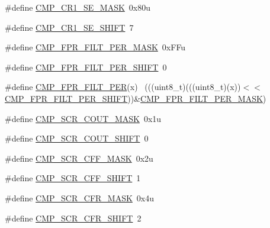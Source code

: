 \begin{DoxyCompactItemize}
\item 
\#define \hyperlink{group___c_m_p___register___masks_ga899d139651dd67746e73452ff19e892b}{C\+M\+P\+\_\+\+C\+R1\+\_\+\+S\+E\+\_\+\+M\+A\+SK}~0x80u
\item 
\#define \hyperlink{group___c_m_p___register___masks_ga57cd3f81d8844d4e0509f342ae5170bb}{C\+M\+P\+\_\+\+C\+R1\+\_\+\+S\+E\+\_\+\+S\+H\+I\+FT}~7
\item 
\#define \hyperlink{group___c_m_p___register___masks_gaf8ca758656c156ecadfbb6f9e57a3eef}{C\+M\+P\+\_\+\+F\+P\+R\+\_\+\+F\+I\+L\+T\+\_\+\+P\+E\+R\+\_\+\+M\+A\+SK}~0x\+F\+Fu
\item 
\#define \hyperlink{group___c_m_p___register___masks_gaa563be7a82c0c1e3802e7ac7c920bf3a}{C\+M\+P\+\_\+\+F\+P\+R\+\_\+\+F\+I\+L\+T\+\_\+\+P\+E\+R\+\_\+\+S\+H\+I\+FT}~0
\item 
\#define \hyperlink{group___c_m_p___register___masks_ga64552c5393c5361b4e87fae0df10308e}{C\+M\+P\+\_\+\+F\+P\+R\+\_\+\+F\+I\+L\+T\+\_\+\+P\+ER}(x)                                        ~(((uint8\+\_\+t)(((uint8\+\_\+t)(x))$<$$<$\hyperlink{group___c_m_p___register___masks_gaa563be7a82c0c1e3802e7ac7c920bf3a}{C\+M\+P\+\_\+\+F\+P\+R\+\_\+\+F\+I\+L\+T\+\_\+\+P\+E\+R\+\_\+\+S\+H\+I\+FT}))\&\hyperlink{group___c_m_p___register___masks_gaf8ca758656c156ecadfbb6f9e57a3eef}{C\+M\+P\+\_\+\+F\+P\+R\+\_\+\+F\+I\+L\+T\+\_\+\+P\+E\+R\+\_\+\+M\+A\+SK})
\item 
\#define \hyperlink{group___c_m_p___register___masks_ga024aec72a28ecdc04a1441cd7a3af23a}{C\+M\+P\+\_\+\+S\+C\+R\+\_\+\+C\+O\+U\+T\+\_\+\+M\+A\+SK}~0x1u
\item 
\#define \hyperlink{group___c_m_p___register___masks_gaa508076192a6b9aed5c4d46282c64394}{C\+M\+P\+\_\+\+S\+C\+R\+\_\+\+C\+O\+U\+T\+\_\+\+S\+H\+I\+FT}~0
\item 
\#define \hyperlink{group___c_m_p___register___masks_gaab44e3da0576b12dd809881323944a1c}{C\+M\+P\+\_\+\+S\+C\+R\+\_\+\+C\+F\+F\+\_\+\+M\+A\+SK}~0x2u
\item 
\#define \hyperlink{group___c_m_p___register___masks_ga076d455f0d5bdad02282cbcce6e04c01}{C\+M\+P\+\_\+\+S\+C\+R\+\_\+\+C\+F\+F\+\_\+\+S\+H\+I\+FT}~1
\item 
\#define \hyperlink{group___c_m_p___register___masks_ga876bfa2799338c6b10b152940d25c4a7}{C\+M\+P\+\_\+\+S\+C\+R\+\_\+\+C\+F\+R\+\_\+\+M\+A\+SK}~0x4u
\item 
\#define \hyperlink{group___c_m_p___register___masks_ga78595d16db987c96e73ce96fc5436f6b}{C\+M\+P\+\_\+\+S\+C\+R\+\_\+\+C\+F\+R\+\_\+\+S\+H\+I\+FT}~2
\item 
$$
\end{DoxyCompactItemize}
